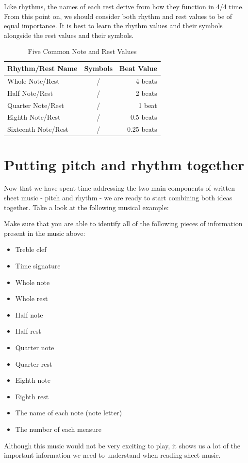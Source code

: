 Like rhythms, the names of each rest derive from how they function in 4/4 time. From this point on, we should consider both rhythm and rest values to be of equal importance. It is best to learn the rhythm values and their symbols alongside the rest values and their symbols.

\begin{table}[h]
	\large
	\centering
	\caption{Five Common Note and Rest Values}
	\label{tab:booktabs_example}
	\begin{tabular}{lcr}
		\toprule
		\textbf{Rhythm/Rest Name} & \textbf{Symbols} & \textbf{Beat Value} \\ 
		\midrule
		Whole Note/Rest       & \wholeNote / \wholeNoteRest        & 4 beats         \\
		Half Note/Rest        & \halfNote / \halfNoteRest          & 2 beats         \\
		Quarter Note/Rest     & \quarterNote / \crotchetRest       & 1 beat          \\
		Eighth Note/Rest	  & \eighthNote / \quaverRest	       & 0.5 beats		 \\
		Sixteenth Note/Rest   & \sixteenthNote / \semiquaverRest   & 0.25 beats      \\
		\bottomrule
	\end{tabular}
\end{table}

\section{Putting pitch and rhythm together}

Now that we have spent time addressing the two main components of written sheet music - pitch and rhythm - we are ready to start combining both ideas together. Take a look at the following musical example: 

\begin{figure}[h]
	\begin{center}
	\end{center}
\end{figure}

Make sure that you are able to identify all of the following pieces of information present in the music above:

\begin{itemize}
	\item Treble clef
	\item Time signature
	\item Whole note
	\item Whole rest
	\item Half note
	\item Half rest
	\item Quarter note
	\item Quarter rest
	\item Eighth note
	\item Eighth rest
	\item The name of each note (note letter)
	\item The number of each measure
\end{itemize}
	
Although this music would not be very exciting to play, it shows us a lot of the important information we need to understand when reading sheet music.


